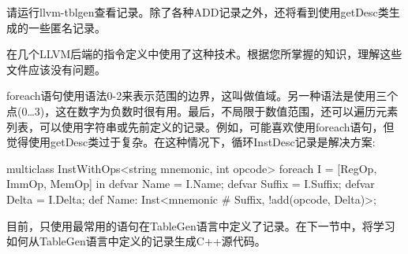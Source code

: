 请运行llvm-tblgen查看记录。除了各种ADD记录之外，还将看到使用getDesc类生成的一些匿名记录。

在几个LLVM后端的指令定义中使用了这种技术。根据您所掌握的知识，理解这些文件应该没有问题。

foreach语句使用语法0-2来表示范围的边界，这叫做值域。另一种语法是使用三个点(0…3)，这在数字为负数时很有用。最后，不局限于数值范围，还可以遍历元素列表，可以使用字符串或先前定义的记录。例如，可能喜欢使用foreach语句，但觉得使用getDesc类过于复杂。在这种情况下，循环InstDesc记录是解决方案:

\begin{shell}
multiclass InstWithOps<string mnemonic, int opcode> {
    foreach I = [RegOp, ImmOp, MemOp] in {
        defvar Name = I.Name;
        defvar Suffix = I.Suffix;
        defvar Delta = I.Delta;
        def Name: Inst<mnemonic # Suffix, !add(opcode, Delta)>;
    }
}
\end{shell}

目前，只使用最常用的语句在TableGen语言中定义了记录。在下一节中，将学习如何从TableGen语言中定义的记录生成C++源代码。




